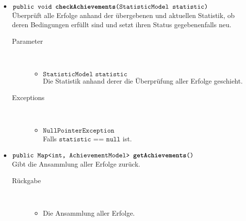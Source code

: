 \begin{description}
\begin{itemize}
\begin{itemize}
		\item $\texttt{public void \textbf{checkAchievements}(StatisticModel statistic)}$ \\ Überprüft alle Erfolge anhand der übergebenen und aktuellen Statistik, ob deren Bedingungen erfüllt sind und setzt ihren Status gegebenenfalls neu.
		\begin{description}
		\item[Parameter] \hfill \\
			\vspace{-.8cm}
			\begin{itemize}
				\item $\texttt{StatisticModel statistic}$ \\ Die Statistik anhand derer die Überprüfung aller Erfolge geschieht. 
			\end{itemize}
			\item[Exceptions] \hfill \\
			\vspace{-.8cm}
			\begin{itemize}
				\item $\texttt{NullPointerException}$ \\ Falls $\texttt{statistic == null}$ ist.
			\end{itemize}
		\end{description}	
		
		\item $\texttt{public Map<int, AchievementModel> \textbf{getAchievements}()}$ \\ Gibt die Ansammlung aller Erfolge zurück.
		\begin{description}
			\item[Rückgabe] \hfill \\
			\vspace{-.8cm}
			\begin{itemize}
				\item Die Ansammlung aller Erfolge.
			\end{itemize}
		\end{description}
		

\end{itemize}
\end{itemize}
\end{description}
